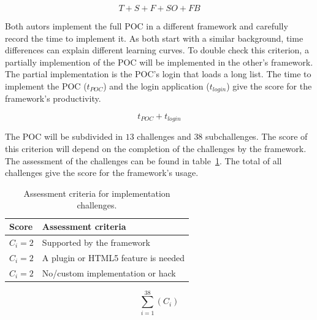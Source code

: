 \documentclass[a4paper]{artikel3}
\newcommand{\setspace}[0]{\vspace{2mm}}
\renewcommand{\paragraph}[1]{\setspace \noindent {\bf #1}  }
\begin{document}
\begin{equation}
  T+S+F+SO+FB
  \label{eq:populariteit}
\end{equation}

\paragraph{Productivity}
Both autors implement the full POC in a different framework and carefully record the time to implement it.  
As both start with a similar background,  time differences can explain different learning curves.  
To double check this criterion,  a partially implemention of the POC will be implemented in the other's framework.  
The partial implementation is the POC's login that loads a long list.%
The time to implement the POC ($t_{POC}$) and the login application ($t_{login}$) give the score for the framework's productivity. 

\begin{equation}
  {t_{POC} + t_{login}}
  \label{eq:productiviteit}
\end{equation}

\paragraph{Usage}
The POC will be subdivided in $13$ challenges and $38$ subchallenges.  
The score of this criterion will depend on the completion of the challenges by the framework.  
The assessment of the challenges can be found in table~\ref{table:challenges-scores}.  
The total of all challenges give the score for the framework's usage.

\begin{table}[h]	
\centering
\begin{tabular}{ll}
\toprule
\textbf{Score} & \textbf{Assessment criteria}\\
\midrule
$C_{i} = 2$ & Supported by the framework\\
$C_{i} = 2$ & A plugin or HTML5 feature is needed\\
$C_{i} = 2$ & No/custom implementation or hack\\
\bottomrule
\end{tabular}
\caption{Assessment criteria for implementation challenges.}
\label{table:challenges-scores}
\end{table}

\begin{equation}
  \sum_{i=1}^{38}{\left(C_{i}\right)}
  \label{eq:gebruik}
\end{equation}
\end{document}
